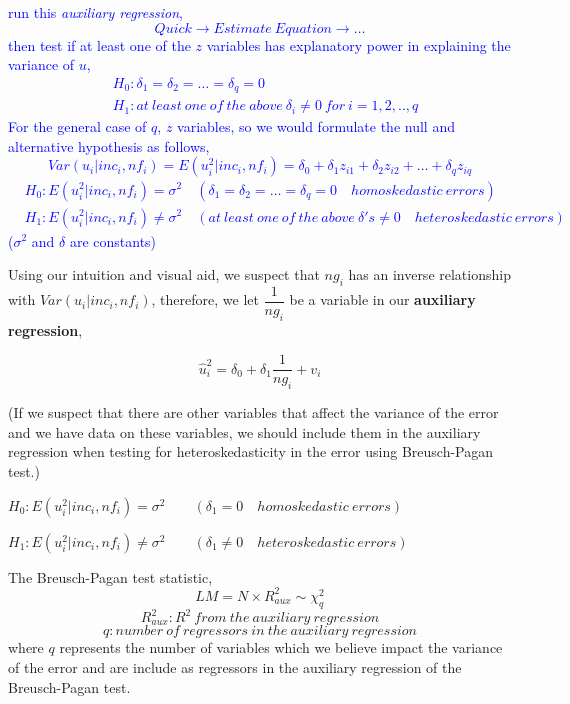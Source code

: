 \documentclass[12pt]{report}
\newenvironment{blueframed}[1][blue]
{\def\FrameCommand{\fboxsep=\FrameSep\fcolorbox{#1}{white}}%
\MakeFramed {\advance\hsize-\width \FrameRestore}}
{\endMakeFramed}
\begin{document}
\justify
\begin{blueframed}
	\vspace{-\baselineskip}
	\justify
	\noindent \textcolor{blue}
	{	\noindent run this \textit{auxiliary regression}, 
		$$Quick \to Estimate\ Equation \to \dots$$
		\noindent then test if at least one of the $z$ variables has explanatory power in explaining the variance of $u$,
		\begin{align*}
			&H_0: \delta_1 = \delta_2 = \dots = \delta_q = 0 \\
			&H_1:at\ least\ one\ of\ the\ above\ \delta_i \neq 0\ for\ i=1,2,..,q
		\end{align*}
		For the general case of $q$, $z$ variables, so we would formulate the null and alternative hypothesis as follows, $$Var(u_i|inc_i,nf_i) = E(u^2_i|inc_i,nf_i) = \delta_0 + \delta_1z_{i1} + \delta_2z_{i2} + \dots + \delta_qz_{iq}$$
		\begin{align*}
			&H_0: E(u^2_i|inc_i,nf_i) = \sigma^2 \quad (\delta_1 = \delta_2 = \dots = \delta_q = 0 \quad homoskedastic\ errors) \\
			&H_1: E(u^2_i|inc_i,nf_i) \neq \sigma^2 \quad (at\ least\ one\ of\ the\ above\ \delta's \neq 0 \quad heteroskedastic\ errors)
		\end{align*} ($\sigma^2$ and $\delta$ are constants)
	}
\end{blueframed}

\noindent Using our intuition and visual aid, we suspect that $ng_i$ has an inverse relationship with $Var(u_i|inc_i,nf_i)$, therefore, we let $\dfrac{1}{ng_i}$ be a variable in our \textbf{auxiliary regression},

$$\hat{u}^2_i = \delta_0 + \delta_1\dfrac{1}{ng_i} + v_i$$

\noindent (If we suspect that there are other variables that affect the variance of the error and we have data on these variables, we should include them in the auxiliary regression when testing for heteroskedasticity in the error using Breusch-Pagan test.)

\noindent $H_0: E(u^2_i|inc_i,nf_i) = \sigma^2 \qquad (\delta_1 = 0 \quad homoskedastic\ errors)$

\noindent $H_1: E(u^2_i|inc_i,nf_i) \neq \sigma^2 \qquad (\delta_1 \neq 0 \quad heteroskedastic\ errors)$

\noindent The Breusch-Pagan test statistic,
$$LM =  N\times R^2_{aux} \sim \chi_{q}^2$$ $$R^2_{aux}: R^2\ from\ the\ auxiliary\ regression$$ $$q:number\ of\ regressors\ in\ the\ auxiliary\ regression$$
\noindent where $q$ represents the number of variables which we believe impact the variance of the error and are include as regressors in the auxiliary regression of the Breusch-Pagan test.
\end{document}
